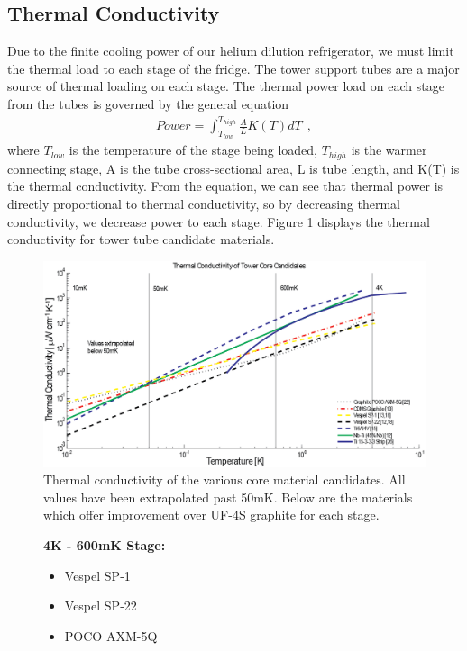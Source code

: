 \documentclass{report}
\begin{document}
\begin{multicols}{2}
\subsection{Thermal Conductivity}
Due to the finite cooling power of our helium dilution refrigerator, we must limit the
thermal load to each stage of the fridge. The tower support tubes are a major source of
thermal loading on each stage. The thermal power load on each stage from the tubes is
governed by the general equation
\begin{eqnarray}
Power = \int_{T_{low}}^{T_{high}} \frac{A}{L}K(T)dT \ \ , %
\end{eqnarray}
where $T_{low}$ is the temperature of the stage being loaded, $T_{high}$ is the warmer
connecting stage, A is the tube cross-sectional area, L is tube length, and K(T) is the
thermal conductivity. From the equation, we can see that thermal power is directly proportional
to thermal conductivity, so by decreasing thermal conductivity, we decrease power to each
stage. Figure 1 displays the thermal conductivity for tower tube candidate materials.
\begin{figure}[htb]
\includegraphics[width = \textwidth]{TowerCond.png}
\caption{Thermal conductivity of the various core material candidates. All values have been
extrapolated past 50mK. Below are the materials which offer improvement over UF-4S
graphite for each stage.}
\end{figure}
\begin{figure}[htb]
\centering
\begin{minipage}[t]{.3\textwidth}
\textbf{4K - 600mK Stage:}
\begin{itemize}
\item Vespel SP-1
\item Vespel SP-22
\item POCO AXM-5Q

\end{itemize}
\end{minipage}
\end{figure}
\end{multicols}
\end{document}
